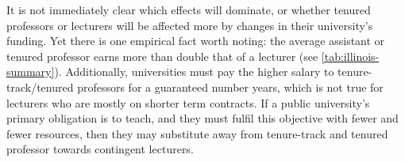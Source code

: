 It is not immediately clear which effects will dominate, or whether tenured professors or lecturers will be affected more by changes in their university's funding.
Yet there is one empirical fact worth noting: the average assistant or tenured professor earns more than double that of a lecturer (see \autoref{tab:illinois-summary}).
Additionally, universities must pay the higher salary to tenure-track/tenured professors for a guaranteed number years, which is not true for lecturers who are mostly on shorter term contracts.
If a public university's primary obligation is to teach, and they must fulfil this objective with fewer and fewer resources, then they may substitute away from tenure-track and tenured professor towards contingent lecturers.
